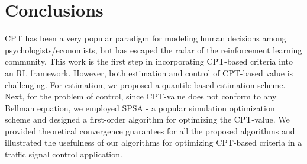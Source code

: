 \documentclass[twocolumn]{IEEEtran}
\begin{document}




\section{Conclusions}
\label{sec:conclusions}
CPT has been a very popular paradigm for modeling human decisions among psychologists/economists, but has escaped the radar of the reinforcement learning community. This work is the first step in incorporating CPT-based criteria into an RL framework. However, both estimation and control of CPT-based value is challenging. 
For estimation, we proposed a quantile-based estimation scheme. Next, for the problem of control, since CPT-value does not conform to any Bellman equation, we employed SPSA - a popular simulation optimization scheme and designed a first-order algorithm for optimizing the CPT-value. 
We provided theoretical convergence guarantees for all the proposed algorithms and illustrated the usefulness of our algorithms for optimizing CPT-based criteria in a traffic signal control application.



%





%
\end{document}
